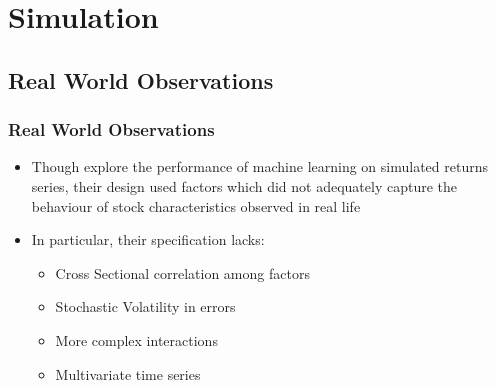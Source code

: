 \documentclass[]{beamer}
\begin{document}
\section{Simulation}

\subsection{Real World Observations}
\begin{frame}
\frametitle{Real World Observations}
\begin{itemize}
	\item Though \cite{gu_empirical_2018} explore the performance of machine learning on simulated returns series, their design used factors which did not adequately capture the behaviour of stock characteristics observed in real life
	\item In particular, their specification lacks:
	\begin{itemize}
		\item Cross Sectional correlation among factors
		\item Stochastic Volatility in errors
		\item More complex interactions
		\item Multivariate time series
	\end{itemize}
\end{itemize}
\end{frame}
\end{document}
